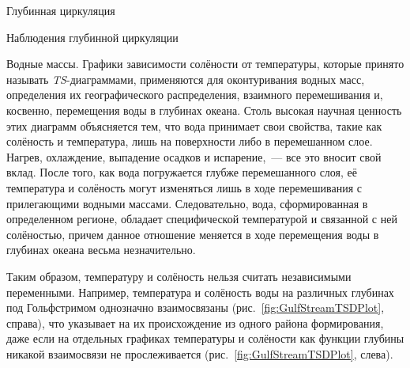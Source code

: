 \begin{chapter}{Глубинная циркуляция}
\begin{section}{Наблюдения глубинной циркуляции}
\begin{paragraph}{Водные массы.}
Графики зависимости солёности от температуры, которые принято называть
\emph{TS}-диаграммами, применяются для оконтуривания водных масс, определения
их географического распределения, взаимного 
перемешивания и, косвенно, перемещения воды
в глубинах океана. Столь высокая научная ценность этих диаграмм объясняется
тем, что вода принимает свои свойства, такие как солёность и температура,
лишь на поверхности либо в перемешанном 
слое. Нагрев, охлаждение, 
выпадение осадков и испарение,~--- все это вносит свой вклад. 
После того, как вода погружается глубже перемешанного 
слоя, её температура и солёность могут изменяться 
лишь в ходе перемешивания 
с прилегающими водными массами. Следовательно, вода, сформированная в 
определенном регионе, обладает специфической температурой и связанной с ней
солёностью, причем данное отношение меняется в ходе перемещения воды в 
глубинах океана весьма незначительно.
%

Таким образом, температуру и солёность нельзя считать независимыми переменными.
Например, температура и солёность воды на различных глубинах под 
Гольфстримом однозначно взаимосвязаны
(рис.~\ref{fig:GulfStreamTSDPlot}, справа), что указывает на их происхождение
из одного района формирования, даже если на отдельных графиках температуры 
и солёности как функции глубины никакой взаимосвязи не прослеживается
(рис.~\ref{fig:GulfStreamTSDPlot}, слева).
%


\end{paragraph}
\end{section}
\end{chapter}
